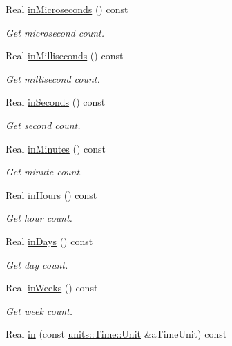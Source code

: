 \begin{DoxyCompactItemize}
Real \hyperlink{classlibrary_1_1physics_1_1time_1_1_duration_a69c9501a4432aac49cecd9d47da7c4f6}{in\+Microseconds} () const
\begin{DoxyCompactList}\small\item\em Get microsecond count. \end{DoxyCompactList}\item 
Real \hyperlink{classlibrary_1_1physics_1_1time_1_1_duration_ac7c1fce0e8488954fe9e2abe1767548b}{in\+Milliseconds} () const
\begin{DoxyCompactList}\small\item\em Get millisecond count. \end{DoxyCompactList}\item 
Real \hyperlink{classlibrary_1_1physics_1_1time_1_1_duration_a9272debd96e7f86df9b0852c6663a0bb}{in\+Seconds} () const
\begin{DoxyCompactList}\small\item\em Get second count. \end{DoxyCompactList}\item 
Real \hyperlink{classlibrary_1_1physics_1_1time_1_1_duration_aef580516014096d1e5ae5bb6ae8e6f29}{in\+Minutes} () const
\begin{DoxyCompactList}\small\item\em Get minute count. \end{DoxyCompactList}\item 
Real \hyperlink{classlibrary_1_1physics_1_1time_1_1_duration_a1f5e207d7c6f7b62d3cfee13e75dfa48}{in\+Hours} () const
\begin{DoxyCompactList}\small\item\em Get hour count. \end{DoxyCompactList}\item 
Real \hyperlink{classlibrary_1_1physics_1_1time_1_1_duration_a73ebd929416f360ff5c4c840fbcae67b}{in\+Days} () const
\begin{DoxyCompactList}\small\item\em Get day count. \end{DoxyCompactList}\item 
Real \hyperlink{classlibrary_1_1physics_1_1time_1_1_duration_ae49243cf87ccf07693b65e7170642b65}{in\+Weeks} () const
\begin{DoxyCompactList}\small\item\em Get week count. \end{DoxyCompactList}\item 
Real \hyperlink{classlibrary_1_1physics_1_1time_1_1_duration_ace9b1e589d3dc6e76002d389e2a480df}{in} (const \hyperlink{classlibrary_1_1physics_1_1units_1_1_time_ab876a6a05c9a2f28905f2753bfd64109}{units\+::\+Time\+::\+Unit} \&a\+Time\+Unit) const

\end{DoxyCompactItemize}
